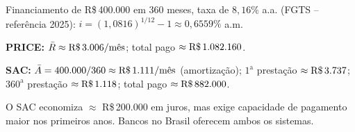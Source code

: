 \begin{moderno}[title={PRICE vs.\ SAC no Financiamento Imobiliário FGTS (2025)}]
Financiamento de R\$\,400.000 em 360 meses, taxa de $8{,}16\%$ a.a. (FGTS -- referência 2025):
$i = (1{,}0816)^{1/12}-1 \approx 0{,}6559\%$ a.m.

\medskip
\textbf{PRICE:} $\bar{R} \approx \text{R\$\,}3.006/\text{mês}$; total pago $\approx \text{R\$\,}1.082.160$.

\medskip
\textbf{SAC:} $\bar{A} = 400.000/360 \approx \text{R\$\,}1.111/\text{mês}$ (amortização);
  $1^\text{a}$ prestação $\approx \text{R\$\,}3.737$; $360^\text{a}$ prestação $\approx \text{R\$\,}1.118$;
  total pago $\approx \text{R\$\,}882.000$.

\medskip
O SAC economiza $\approx$ R\$\,200.000 em juros, mas exige capacidade de pagamento maior
nos primeiros anos. Bancos no Brasil oferecem ambos os sistemas.
\end{moderno}
